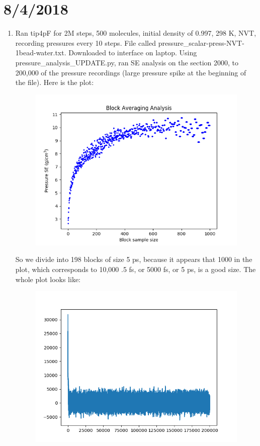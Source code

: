 \documentclass[12pt,reqno]{amsart}
\numberwithin{equation}{section}
\begin{document}
\section{8/4/2018}
\begin{enumerate}
\item Ran tip4pF for 2M steps, 500 molecules, initial density of 0.997, 298 K, NVT, recording pressures every 10 steps.  File called pressure\_scalar-press-NVT-1bead-water.txt.  Downloaded to interface on laptop.  Using pressure\_analysis\_UPDATE.py, ran SE analysis on the section 2000, to 200,000 of the pressure recordings (large pressure spike at the beginning of the file).  Here is the plot:
\begin{figure}[H]
\centering
\includegraphics[scale=0.6]{pressure_block_averaging_NVT-1bead-water}
\end{figure}
So we divide into 198 blocks of size 5 ps, because it appears that 1000 in the plot, which corresponds to 10,000 .5 fs, or 5000 fs, or 5 ps, is a good size.  The whole plot looks like:
\begin{figure}[H]
\centering
\includegraphics[scale=0.6]{pressures_NVT-1bead-water-full}

\end{figure}
\end{enumerate}
\end{document}
